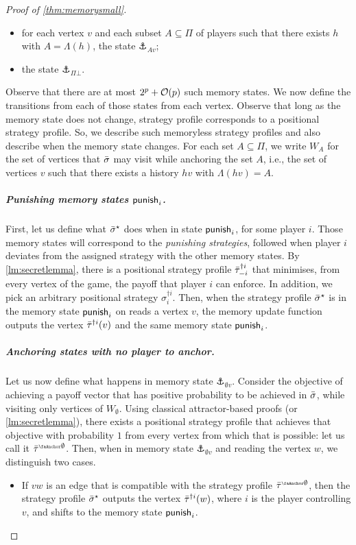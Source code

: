 \begin{proof}[Proof of \cref{thm:memorysmall}]
\begin{itemize}
        \item for each vertex $v$ and each subset $A \subseteq \Pi$ of players such that there exists $h$ with $A = \Lambda(h)$, the state $\anchor_{Av}$;

        \item the state $\anchor_{\Pi\bot}$.
    \end{itemize}
Observe that there are at most $2^p + \mathcal{O}(p)$ such memory states.
We now define the transitions from each of those states from each vertex. Observe that long as the memory state does not change, strategy profile corresponds to a positional strategy profile. So, we describe such memoryless strategy profiles and also describe when the memory state changes. 
For each set $A \subseteq \Pi$, we write $W_A$ for the set of vertices that ${\bar{\sigma}}$ may visit while anchoring the set $A$, i.e., the set of vertices $v$ such that there exists a history $hv$ with $\Lambda(hv) = A$.

    \subparagraph*{Punishing memory states $\mathsf{punish}_i$.}
    First, let us define what ${\bar{\sigma}}^\star$ does when in state $\mathsf{punish}_i$, for some player $i$. Those memory states will correspond to the \emph{punishing strategies}, followed when player $i$ deviates from the assigned strategy with the other memory states. 
    By \cref{lm:secretlemma}, there is a positional strategy profile ${\bar{\tau}}^{\dag i}_{-i}$ that minimises, from every vertex of the game, the payoff that player $i$ can enforce.
    In addition, we pick an arbitrary positional strategy $\sigma^{\dag i}_i$.
    Then, when the strategy profile ${\bar{\sigma}}^\star$ is in the memory state $\mathsf{punish}_i$ on reads a vertex $v$, the memory update function outputs the vertex ${\bar{\tau}}^{\dag i}(v)$ and the same memory state $\mathsf{punish}_i$.

    \subparagraph*{Anchoring states with no player to anchor.}
    Let us now define what happens in memory state $\anchor_{\emptyset v}$.
    Consider the objective of achieving a payoff vector that has positive probability to be achieved in ${\bar{\sigma}}$, while visiting only vertices of $W_\emptyset$.
    Using classical attractor-based proofs (or \cref{lm:secretlemma}), there exists a positional strategy profile that achieves that objective with probability $1$ from every vertex from which that is possible: let us call it $\btau^{\anch \emptyset}$.
    Then, when in memory state $\anchor_{\emptyset v}$ and reading the vertex $w$, we distinguish two cases.
    \begin{itemize}
        \item If $vw$ is an edge that is compatible with the strategy profile $\btau^{\anch \emptyset}$, then the strategy profile ${\bar{\sigma}}^\star$ outputs the vertex ${\bar{\tau}}^{\dag i}(w)$, where $i$ is the player controlling $v$, and shifts to the memory state $\mathsf{punish}_i$.


\end{itemize}
\end{proof}
